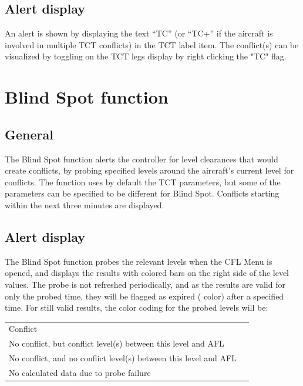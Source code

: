 \documentclass[a4paper,oneside,11pt]{memoir}
\begin{document}
\subsection{Alert display}

An alert is shown by displaying the text “TC” (or “TC+” if the aircraft is involved in multiple TCT conflicts) in the TCT label item. The conflict(s) can be visualized by toggling on the TCT legs display by right clicking the "TC" flag.


\section{Blind Spot function}\label{tool:bs}

\subsection{General}

The Blind Spot function alerts the controller for level clearances that would create conflicts, by probing specified levels around the aircraft’s current level for conflicts. The function uses by default the TCT parameters, but some of the parameters can be specified to be different for Blind Spot. Conflicts starting within the next three minutes are displayed.


\subsection{Alert display}

The Blind Spot function probes the relevant levels when the CFL Menu is opened, and displays the results with colored bars on the right side of the level values. The probe is not refreshed periodically, and as the results are valid for only the probed time, they will be flagged as expired ( color) after a specified time. For still valid results, the color coding for the probed levels will be:

\bigskip

\begin{tabular}{l l}
  Conflict                                                          & {BS Warning}       \\
  No conflict, but conflict level(s) between this level and AFL     & {BS Crossed Level} \\
  No conflict, and no conflict level(s) between this level and AFL  & {BS No Conflict}   \\
  No calculated data due to probe failure                           & {BS Unknown}       \\
\end{tabular}
\end{document}
